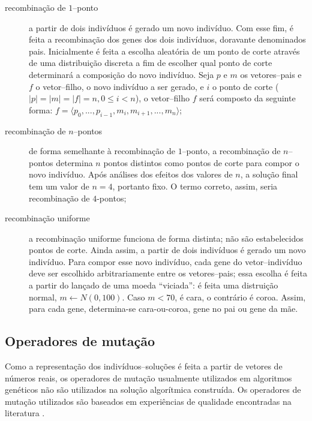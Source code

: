 \documentclass[relatorio,nocolorlinks]{inf-ufg}
\begin{document}
\begin{description}
\item[recombina\c{c}\~{a}o de $1$--ponto] a partir de dois indiv\'{i}duos \'{e} gerado um novo indiv\'{i}duo. Com esse fim, \'{e} feita a
recombina\c{c}\~{a}o dos genes dos dois indiv\'{i}duos, doravante denominados pais. Inicialmente \'{e} feita a escolha aleat\'{o}ria de um
ponto de corte atrav\'{e}s de uma distribui\c{c}\~{a}o discreta a fim de escolher qual ponto de corte determinar\'{a} a composi\c{c}\~{a}o
do novo indiv\'{i}duo. Seja $p$ e $m$ os vetores--pais e $f$ o vetor--filho, o novo indiv\'{i}duo a ser gerado, e $i$ o ponto de corte
($|p| = |m| = |f| = n, 0 \leq i < n$), o vetor--filho $f$ ser\'{a} composto da seguinte forma:
$f = \langle p_{0}, ..., p_{i-1}, m_{i}, m_{i+1}, ..., m_{n} \rangle$;
\item[recombina\c{c}\~{a}o de $n$--pontos] de forma semelhante \`{a} recombina\c{c}\~{a}o de $1$--ponto, a recombina\c{c}\~{a}o de $n$--pontos
determina $n$ pontos distintos como pontos de corte para compor o novo indiv\'{i}duo. Ap\'{o}s an\'{a}lises dos efeitos dos valores de $n$,
a solu\c{c}\~{a}o final tem um valor de $n = 4$, portanto fixo. O termo correto, assim, seria recombina\c{c}\~{a}o de $4$-pontos;
\item[recombina\c{c}\~{a}o uniforme] a recombina\c{c}\~{a}o uniforme funciona de forma distinta; n\~{a}o s\~{a}o estabelecidos pontos de
corte. Ainda assim,  a partir de dois indiv\'{i}duos \'{e} gerado um novo indiv\'{i}duo. Para compor esse novo indiv\'{i}duo, cada gene do
vetor--indiv\'{i}duo deve ser escolhido arbitrariamente entre os vetores--pais; essa escolha \'{e} feita a partir do lan\c{c}ado de uma moeda
``viciada'': \'{e} feita uma distrui\c{c}\~{a}o normal, $m \leftarrow N(0, 100)$. Caso $m < 70$, \'{e} cara, o contr\'{a}rio \'{e} coroa.
Assim, para cada gene, determina-se cara-ou-coroa, gene no pai ou gene da m\~{a}e.
\end{description}

\subsection{Operadores de muta\c{c}\~{a}o}
Como a representa\c{c}\~{a}o dos indiv\'{i}duos--solu\c{c}\~{o}es \'{e} feita a partir de vetores de n\'{u}meros reais, os operadores de
muta\c{c}\~{a}o usualmente utilizados em algoritmos gen\'{e}ticos n\~{a}o s\~{a}o utilizados na solu\c{c}\~{a}o algor\'{i}tmica constru\'{i}da.
Os operadores de muta\c{c}\~{a}o utilizados s\~{a}o baseados em experi\^{e}ncias de qualidade encontradas na literatura \cite{Goncalves2002}
\cite{Lin2010}.
\end{document}
